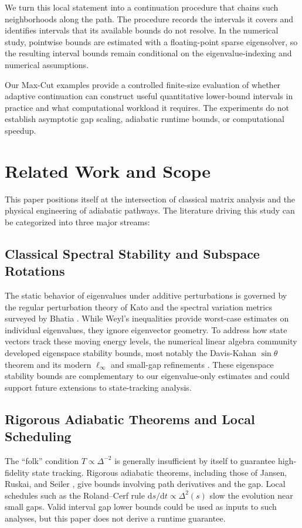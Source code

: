 \documentclass[11pt, a4paper]{article}
\newcommand{\dd}{\mathrm{d}}
\begin{document}
We turn this local statement into a continuation procedure that chains such neighborhoods along the path. The procedure records the intervals it covers and identifies intervals that its available bounds do not resolve. In the numerical study, pointwise bounds are estimated with a floating-point sparse eigensolver, so the resulting interval bounds remain conditional on the eigenvalue-indexing and numerical assumptions.

Our Max-Cut examples provide a controlled finite-size evaluation of whether adaptive continuation can construct useful quantitative lower-bound intervals in practice and what computational workload it requires. The experiments do not establish asymptotic gap scaling, adiabatic runtime bounds, or computational speedup.

\section{Related Work and Scope}
This paper positions itself at the intersection of classical matrix analysis and the physical engineering of adiabatic pathways. The literature driving this study can be categorized into three major streams:

\subsection{Classical Spectral Stability and Subspace Rotations}
The static behavior of eigenvalues under additive perturbations is governed by the regular perturbation theory of Kato \cite{Kato1966} and the spectral variation metrics surveyed by Bhatia \cite{Bhatia2007}. While Weyl's inequalities provide worst-case estimates on individual eigenvalues, they ignore eigenvector geometry. To address how state vectors track these moving energy levels, the numerical linear algebra community developed eigenspace stability bounds, most notably the Davis-Kahan $\sin\theta$ theorem \cite{DavisKahan1970} and its modern $\ell_\infty$ and small-gap refinements \cite{Fan2018, TranVu2022}. These eigenspace stability bounds are complementary to our eigenvalue-only estimates and could support future extensions to state-tracking analysis.

\subsection{Rigorous Adiabatic Theorems and Local Scheduling}
The ``folk'' condition $T\propto\Delta^{-2}$ is generally insufficient by itself to guarantee high-fidelity state tracking. Rigorous adiabatic theorems, including those of Jansen, Ruskai, and Seiler \cite{JRS2007}, give bounds involving path derivatives and the gap. Local schedules such as the Roland--Cerf rule $\dd s/\dd t\propto\Delta^2(s)$ \cite{RolandCerf2002} slow the evolution near small gaps. Valid interval gap lower bounds could be used as inputs to such analyses, but this paper does not derive a runtime guarantee.
\end{document}
